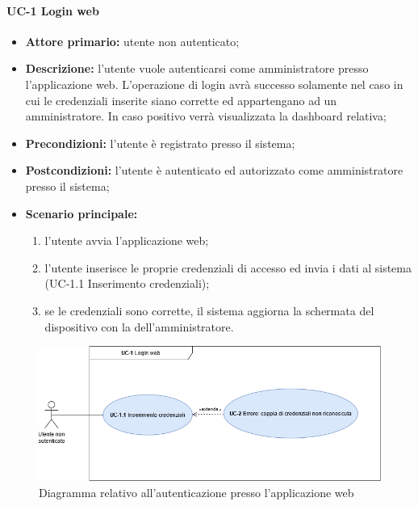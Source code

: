 
\paragraph{UC-1 Login web}
\begin{itemize}
	\item \textbf{Attore primario:} utente non autenticato; 

	\item \textbf{Descrizione:} l'utente vuole autenticarsi come amministratore presso l'applicazione web. L'operazione di login avrà successo solamente nel caso in cui le credenziali inserite siano corrette ed appartengano ad un amministratore. In caso positivo verrà visualizzata la dashboard relativa;

	\item \textbf{Precondizioni:} l'utente è registrato presso il sistema;

	\item \textbf{Postcondizioni:} l'utente è autenticato ed autorizzato come amministratore presso il sistema;

	\item \textbf{Scenario principale:}
	      \begin{enumerate}
		      \item l'utente avvia l'applicazione web;
		      \item l'utente inserisce le proprie credenziali di accesso ed invia i dati al sistema (UC-1.1 Inserimento credenziali);
		      \item se le credenziali sono corrette, il sistema aggiorna la schermata del dispositivo con la  dell'amministratore.
	      \end{enumerate}
\end{itemize}

\begin{figure}[H]
    \centering
      \includegraphics[scale=0.50]{src/CasiDUso/immagini/LoginWeb.png}
    \caption{Diagramma relativo all'autenticazione presso l'applicazione web}
\end{figure}


